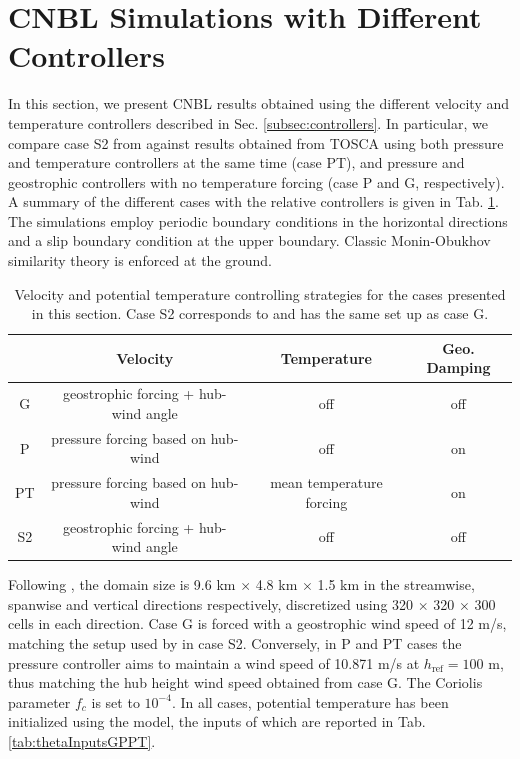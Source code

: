 \documentclass[journal abbreviation, manuscript]{copernicus}
\begin{document}
\section{CNBL Simulations with Different Controllers}
\label{sec:CNBLcontrollers}
In this section, we present CNBL results obtained using the different velocity and temperature controllers described in Sec. \ref{subsec:controllers}. In particular, we compare case S2 from \cite{2017a_AllaertsMeyers} against results obtained from TOSCA using both pressure and temperature controllers at the same time (case PT), and pressure and geostrophic controllers with no temperature forcing (case P and G, respectively). A summary of the different cases with the relative controllers is given in Tab. \ref{tab:cnblControllerCases}. The simulations employ periodic boundary conditions in the horizontal directions and a slip boundary condition at the upper boundary. Classic Monin-Obukhov similarity theory is enforced at the ground. 
\begin{table}[H]
	\begin{center}
		\begin{tabular}{c c c c} 
			\hline
			  & Velocity & Temperature & Geo. Damping\\
			\hline
			G & geostrophic forcing + hub-wind angle & off & off \\
                P & pressure forcing based on hub-wind & off & on\\
                PT & pressure forcing based on hub-wind & mean temperature forcing & on\\
                S2 & geostrophic forcing + hub-wind angle & off & off \\
			\hline
		\end{tabular}
	\end{center}
	\caption{Velocity and potential temperature controlling strategies for the cases presented in this section. Case S2 corresponds to \cite{2017a_AllaertsMeyers} and has the same set up as case G.}
	\label{tab:cnblControllerCases}
\end{table}
Following \cite{2017a_AllaertsMeyers}, the domain size is 9.6 km $\times$ 4.8 km $\times$ 1.5 km in the streamwise, spanwise and vertical directions respectively, discretized using 320 $\times$ 320 $\times$ 300 cells in each direction. Case G is forced with a geostrophic wind speed of 12 m/s, matching the setup used by \cite{2017a_AllaertsMeyers} in case S2. Conversely, in P and PT cases the pressure controller aims to maintain a wind speed of 10.871 m/s at $h_\text{ref}=100$ m, thus matching the hub height wind speed obtained from case G. The Coriolis parameter $f_c$ is set to $10^{-4}$.  In all cases, potential temperature has been initialized using the \cite{2004_RampanelliZardi} model, the inputs of which are reported in Tab. \ref{tab:thetaInputsGPPT}.
\end{document}
